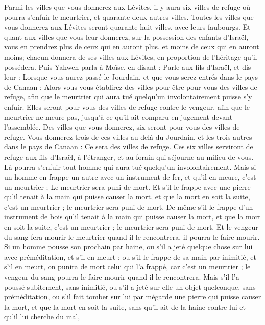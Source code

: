 \begin{multicols}{2}
Parmi les villes que vous donnerez aux Lévites, il y aura six villes de refuge où pourra s'enfuir le meurtrier, et quarante-deux autres villes.
Toutes les villes que vous donnerez aux Lévites seront quarante-huit villes, avec leurs faubourgs.
Et quant aux villes que vous leur donnerez, sur la possession des enfants d'Israël, vous en prendrez plus de ceux qui en auront plus, et moins de ceux qui en auront moins; chacun donnera de ses villes aux Lévites, en proportion de l'héritage qu'il possédera.
Puis Yahweh parla à Moïse, en disant :
Parle aux fils d'Israël, et dis-leur : Lorsque vous aurez passé le Jourdain, et que vous serez entrés dans le pays de Canaan ;
Alors vous vous établirez des villes pour être pour vous des villes de refuge, afin que le meurtrier qui aura tué quelqu'un involontairement puisse s'y enfuir.
Elles seront pour vous des villes de refuge contre le vengeur, afin que le meurtrier ne meure pas, jusqu'à ce qu'il ait comparu en jugement devant l'assemblée.
Des villes que vous donnerez, six seront pour vous des villes de refuge.
Vous donnerez trois de ces villes au-delà du Jourdain, et les trois autres dans le pays de Canaan : Ce sera des villes de refuge.
Ces six villes serviront de refuge aux fils d'Israël, à l'étranger, et au forain qui séjourne au milieu de vous. Là pourra s'enfuir tout homme qui aura tué quelqu'un involontairement.
Mais si un homme en frappe un autre avec un instrument de fer, et qu'il en meure, c'est un meurtrier ; Le meurtrier sera puni de mort.
Et s'il le frappe avec une pierre qu'il tenait à la main qui puisse causer la mort, et que la mort en soit la suite, c'est un meurtrier ; le meurtrier sera puni de mort.
De même s'il le frappe d'un instrument de bois qu'il tenait à la main qui puisse causer la mort, et que la mort en soit la suite, c'est un meurtrier ; le meurtrier sera puni de mort.
Et le vengeur du sang fera mourir le meurtrier quand il le rencontrera, il pourra le faire mourir.
Si un homme pousse son prochain par haine, ou s'il a jeté quelque chose sur lui avec préméditation, et s'il en meurt ;
ou s'il le frappe de sa main par inimitié, et s'il en meurt, on punira de mort celui qui l'a frappé, car c'est un meurtrier ; le vengeur du sang pourra le faire mourir quand il le rencontrera.
Mais s'il l'a poussé subitement, sans inimitié, ou s'il a jeté sur elle un objet quelconque, sans préméditation,
ou s'il fait tomber sur lui par mégarde une pierre qui puisse causer la mort, et que la mort en soit la suite, sans qu'il ait de la haine contre lui et qu'il lui cherche du mal,

\end{multicols}

